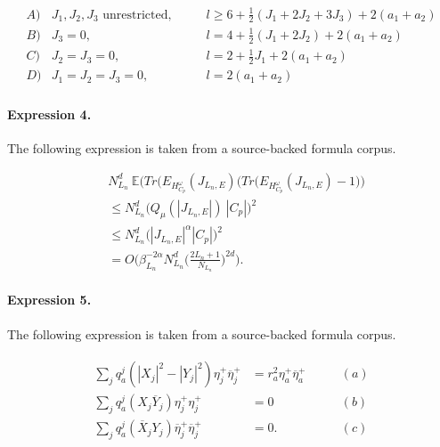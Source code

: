 \documentclass[11pt]{article}
\begin{document}
\begin{align*} \begin{array}{lll} A) & J_1,J_2,J_3\text{ unrestricted,} \qquad & l \geq 6 + \frac{1}{2}(J_1+2 J_2+3 J_3) + 2(a_1+a_2) \\ B) & J_3 = 0, \qquad & l = 4 + \frac{1}{2} (J_1+2 J_2)+ 2(a_1+a_2) \\ C) & J_2=J_3=0, \qquad & l = 2 + \frac{1}{2} J_1 + 2(a_1+a_2) \\ D) & J_1=J_2=J_3=0,\qquad & l = 2 (a_1+a_2) \end{array}\end{align*}

\paragraph{Expression 4.} The following expression is taken from a source-backed formula corpus.

\begin{align*} & N_{L_n}^d~\mathbb{E}\bigg(Tr(E_{H^\omega_{C_p}}(J_{L_n,E})\big(Tr(E_{H^\omega_{C_p}}(J_{L_n,E})-1\big)\bigg) \\ &\leq N_{L_n}^d\bigg(Q_{\mu}(|J_{L_n,E}|)~|C_p|\bigg)^2 \\&\leq N_{L_n}^d\big(|J_{L_n,E}|^\alpha |C_p|\big)^2\\&=O\bigg(\beta_{L_n}^{-2\alpha}N_{L_n}^d\bigg(\frac{2L_n+1}{N_{L_n}}\bigg)^{2d}\bigg).\end{align*}

\paragraph{Expression 5.} The following expression is taken from a source-backed formula corpus.

\begin{align*}\begin{array}{lcr}\sum\limits_{j}q^j_a(|X_j|^2-|Y_j|^2)\eta_j^+\overline{\eta}_j^+&=r^2_a\eta_a^+\overline{\eta}_a^+ \qquad &(a)\\\sum\limits_{j}q^j_a(X_j\overline{Y}_j)\eta_j^+{\eta}_j^+&=0 \qquad &(b)\\\sum\limits_{j}q^j_a(\overline {X}_j{Y_j})\overline{\eta}_j^+\overline{\eta}_j^+&=0. \qquad &(c)\end{array}\end{align*}
\end{document}

